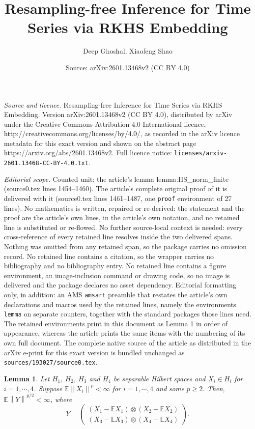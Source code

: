 \documentclass[10pt,a4paper]{amsart}
\title{Resampling-free Inference for Time Series via RKHS Embedding}
\author{Deep Ghoshal, Xiaofeng Shao}
\date{Source: arXiv:2601.13468v2 (CC BY 4.0)}
\newtheorem{lemma}{Lemma}
\newcommand{\bE}{\mathbb{E}}
\begin{document}
\maketitle

\noindent\emph{Source and licence.} Resampling-free Inference for Time Series via RKHS Embedding. Version arXiv:2601.13468v2 (CC BY 4.0), distributed by arXiv under the Creative Commons Attribution 4.0 International licence, http://creativecommons.org/licenses/by/4.0/, as recorded in the arXiv licence metadata for this exact version and shown on the abstract page https://arxiv.org/abs/2601.13468v2. Full licence notice: \texttt{licenses/arxiv-2601.13468-CC-BY-4.0.txt}.\par\smallskip

\noindent\textit{Editorial scope.} Counted unit: the article's lemma lemma:HS\_norm\_finite (source0.tex lines 1454--1460). The article's complete original proof of it is delivered with it (source0.tex lines 1461--1487, one \texttt{proof} environment of 27 lines). No mathematics is written, repaired or re-derived: the statement and the proof are the article's own lines, in the article's own notation, and no retained line is substituted or re-flowed.  No further source-local context is needed: every cross-reference of every retained line resolves inside the two delivered spans.  Nothing was omitted from any retained span, so the package carries no omission record.  No retained line contains a citation, so the wrapper carries no bibliography and no bibliography entry.  No retained line contains a figure environment, an image-inclusion command or drawing code, so no image is delivered and the package declares no asset dependency.  Editorial formatting only, in addition: an AMS \texttt{amsart} preamble that restates the article's own declarations and macros used by the retained lines, namely the environments \texttt{lemma} on separate counters, together with the standard packages those lines need.  The retained environments print in this document as Lemma 1 in order of appearance, whereas the article prints the same items with the numbering of its own full document.  The complete native source of the article as distributed in the arXiv e-print for this exact version is bundled unchanged as \texttt{sources/193027/source0.tex}.
\begin{lemma}\label{lemma:HS_norm_finite}
    Let $H_1$, $H_2$, $H_3$ and $H_4$ be separable Hilbert spaces and $X_i\in H_i$ for $i=1,\cdots,4$. Suppose $\bE \left\|X_i\right\|^{p}<\infty$ for $i=1,\cdots,4$ and some $p\geq 2$. Then, $\bE \left\|Y\right\|^{p/2}<\infty$, where
    $$Y=\begin{pmatrix}
       (X_1-\bE X_1)\otimes  (X_2-\bE X_2)\\
       (X_3-\bE X_3)\otimes  (X_4-\bE X_4)
    \end{pmatrix}.$$
\end{lemma}
\end{document}
